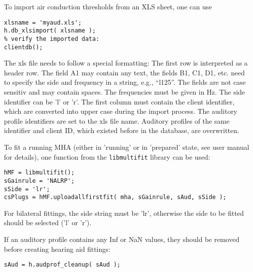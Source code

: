 \documentclass[11pt,a4paper,twoside]{article}
\begin{document}
To import air conduction thresholds from an XLS sheet, one can use
\begin{verbatim}
xlsname = 'myaud.xls';
h.db_xlsimport( xlsname );
% verify the imported data:
clientdb();
\end{verbatim}
The xls file needs to follow a special formatting: The first row is
interpreted as a header row. The field A1 may contain any text, the
fields B1, C1, D1, etc. need to specify the side and frequency in a
string, e.g., ``l125''. The fields are not case sensitiv and may
contain spaces. The frequencies must be given in Hz. The side
identifier can be 'l' or 'r'. The first column must contain the client
identifier, which are converted into upper case during the import
process. The auditory profile identifiers are set to the xls file
name. Auditory profiles of the same identifier and client ID, which
existed before in the database, are overwritten.

To fit a running MHA (either in 'running' or in 'prepared' state, see
user manual for details), one function from the \verb!libmultifit!
library can be used:
\begin{verbatim}
hMF = libmultifit();
sGainrule = 'NALRP';
sSide = 'lr';
csPlugs = hMF.uploadallfirstfit( mha, sGainrule, sAud, sSide );
\end{verbatim}
For bilateral fittings, the side string must be 'lr', otherwise the
side to be fitted should be selected ('l' or 'r').

If an auditory profile contains any Inf or NaN values, they should be
removed before creating hearing aid fittings:
\begin{verbatim}
sAud = h.audprof_cleanup( sAud );
\end{verbatim}



\printindex
\end{document}
